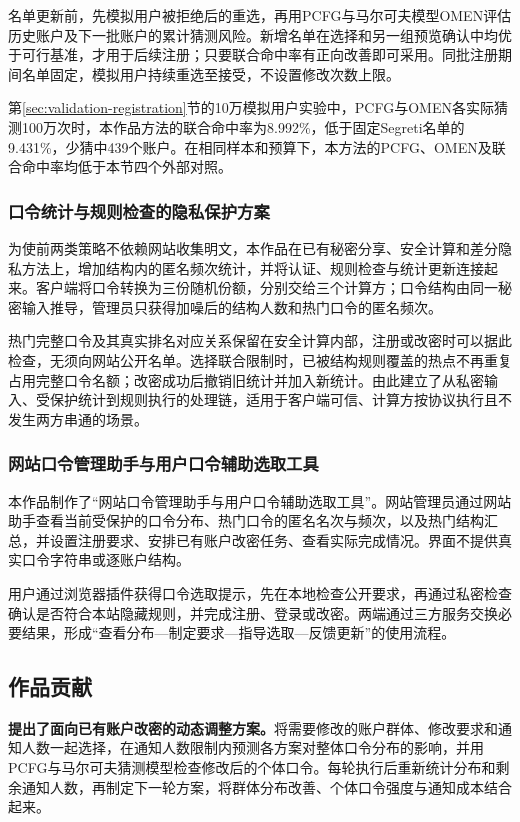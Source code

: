 \documentclass{crypto_report}
\begin{document}
名单更新前，先模拟用户被拒绝后的重选，再用PCFG与马尔可夫模型OMEN评估历史账户及下一批账户的累计猜测风险。新增名单在选择和另一组预览确认中均优于可行基准，才用于后续注册；只要联合命中率有正向改善即可采用。同批注册期间名单固定，模拟用户持续重选至接受，不设置修改次数上限。

第\ref{sec:validation-registration}节的10万模拟用户实验中，PCFG与OMEN各实际猜测100万次时，本作品方法的联合命中率为8.992\%，低于固定Segreti名单的9.431\%，少猜中439个账户。在相同样本和预算下，本方法的PCFG、OMEN及联合命中率均低于本节四个外部对照。

\subsubsection{口令统计与规则检查的隐私保护方案}\label{sec:overview-privacy}

为使前两类策略不依赖网站收集明文，本作品在已有秘密分享、安全计算和差分隐私方法上，增加结构内的匿名频次统计，并将认证、规则检查与统计更新连接起来。客户端将口令转换为三份随机份额，分别交给三个计算方；口令结构由同一秘密输入推导，管理员只获得加噪后的结构人数和热门口令的匿名频次。

热门完整口令及其真实排名对应关系保留在安全计算内部，注册或改密时可以据此检查，无须向网站公开名单。选择联合限制时，已被结构规则覆盖的热点不再重复占用完整口令名额；改密成功后撤销旧统计并加入新统计。由此建立了从私密输入、受保护统计到规则执行的处理链，适用于客户端可信、计算方按协议执行且不发生两方串通的场景。

\subsubsection{网站口令管理助手与用户口令辅助选取工具}\label{sec:overview-tool}

本作品制作了“网站口令管理助手与用户口令辅助选取工具”。网站管理员通过网站助手查看当前受保护的口令分布、热门口令的匿名名次与频次，以及热门结构汇总，并设置注册要求、安排已有账户改密任务、查看实际完成情况。界面不提供真实口令字符串或逐账户结构。

用户通过浏览器插件获得口令选取提示，先在本地检查公开要求，再通过私密检查确认是否符合本站隐藏规则，并完成注册、登录或改密。两端通过三方服务交换必要结果，形成“查看分布—制定要求—指导选取—反馈更新”的使用流程。
\subsection{作品贡献}\label{ux4f5cux54c1ux8d21ux732e}

\textbf{提出了面向已有账户改密的动态调整方案。}将需要修改的账户群体、修改要求和通知人数一起选择，在通知人数限制内预测各方案对整体口令分布的影响，并用PCFG与马尔可夫猜测模型检查修改后的个体口令。每轮执行后重新统计分布和剩余通知人数，再制定下一轮方案，将群体分布改善、个体口令强度与通知成本结合起来。
\end{document}
